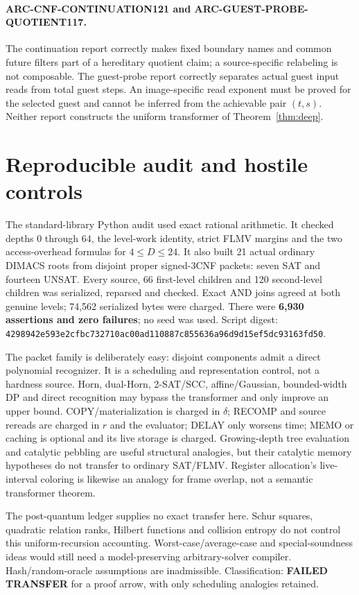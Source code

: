 \documentclass[11pt]{article}
\begin{document}
\paragraph{ARC-CNF-CONTINUATION121 and ARC-GUEST-PROBE-QUOTIENT117.}
The continuation report correctly makes fixed boundary names and common
future filters part of a hereditary quotient claim; a source-specific
relabeling is not composable.  The guest-probe report correctly separates
actual guest input reads from total guest steps.  An image-specific read
exponent must be proved for the selected guest and cannot be inferred from
the achievable pair $(t,s)$.  Neither report constructs the uniform
transformer of Theorem~\ref{thm:deep}.

\section{Reproducible audit and hostile controls}
The standard-library Python audit used exact rational arithmetic.  It checked
depths $0$ through $64$, the level-work identity, strict FLMV margins and the
two access-overhead formulas for $4\le D\le24$.  It also built 21 actual
ordinary DIMACS roots from disjoint proper signed-3CNF packets: seven SAT and
fourteen UNSAT.  Every source, 66 first-level children and 120 second-level
children was serialized, reparsed and checked.  Exact AND joins agreed at
both genuine levels; 74,562 serialized bytes were charged.  There were
\textbf{6,930 assertions and zero failures}; no seed was used.  Script digest:
\texttt{4298942e593e2cfbc732710ac00ad110887c855636a96d9d15ef5dc93163fd50}.

The packet family is deliberately easy: disjoint components admit a direct
polynomial recognizer.  It is a scheduling and representation control, not a
hardness source.  Horn, dual-Horn, 2-SAT/SCC, affine/Gaussian, bounded-width
DP and direct recognition may bypass the transformer and only improve an
upper bound.  COPY/materialization is charged in $\delta$; RECOMP and source
rereads are charged in $r$ and the evaluator; DELAY only worsens time; MEMO
or caching is optional and its live storage is charged.  Growing-depth tree
evaluation and catalytic pebbling are useful structural analogies, but their
catalytic memory hypotheses do not transfer to ordinary SAT/FLMV.  Register
allocation's live-interval coloring is likewise an analogy for frame overlap,
not a semantic transformer theorem.

The post-quantum ledger supplies no exact transfer here.  Schur squares,
quadratic relation ranks, Hilbert functions and collision entropy do not
control this uniform-recursion accounting.  Worst-case/average-case and
special-soundness ideas would still need a model-preserving arbitrary-solver
compiler.  Hash/random-oracle assumptions are inadmissible.  Classification:
\textbf{FAILED TRANSFER} for a proof arrow, with only scheduling analogies
retained.
\end{document}
